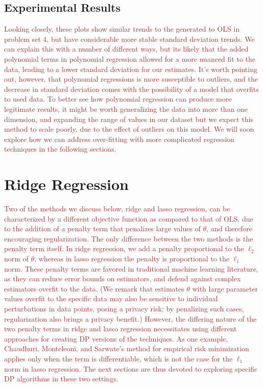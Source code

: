 \documentclass[11pt,conference]{IEEEtran}
\begin{document}
\subsection{Experimental Results}
\textcolor{brown}{Looking closely, these plots show similar trends to the generated to OLS in problem set 4, but have  considerable more stable standard deviation trends. We can explain this with a number of different ways, but its likely that the added polynomial terms in polynomial regression allowed for a more nuanced fit to the data, leading to a lower standard deviation for our estimates. It's worth pointing out, however, that polynomial regressions is more susceptible to outliers, and the decrease in standard deviation comes with the possibility of a model that overfits to used data. To better see how polynomial regression can produce more legitimate results, it might be worth generalizing the data into more than one dimension, and expanding the range of values in our dataset but we expect this method to scale poorly, due to the effect of outliers on this model. We will soon explore how we can address over-fitting with more complicated regression techniques in the following sections.} 

\section{Ridge Regression}
\textcolor{brown}{Two of the methods we discuss below, ridge and lasso regression, can be characterized by a different objective function as compared to that of OLS, due to the addition of a penalty term that penalizes large values of $\theta$, and therefore encouraging regularization. The only difference between the two methods is the penalty term itself. In ridge regression, we add a penalty proportional to the $\ell_2$ norm of $\theta$, whereas in lasso regression the penalty is proportional to the $\ell_1$ norm. These penalty terms are favored in traditional machine learning literature, as they can reduce error bounds on estimators, and defend against complex estimators overfit to the data. (We remark that estimates $\theta$ with large parameter values overfit to the specific data may also be sensitive to individual perturbations in data points, posing a privacy risk; by penalizing such cases, regularization also brings a privacy benefit.) However, the differing nature of the two penalty terms in ridge and lasso regression necessitates using different approaches for creating DP versions of the techniques. As one example, Chaudhuri, Monteleoni, and Sarwate's method for empirical risk minimization applies only when the term is differentiable, which is not the case for the $\ell_1$ norm in lasso regression. The next sections are thus devoted to exploring specific DP algorithms in these two settings.}
\end{document}
